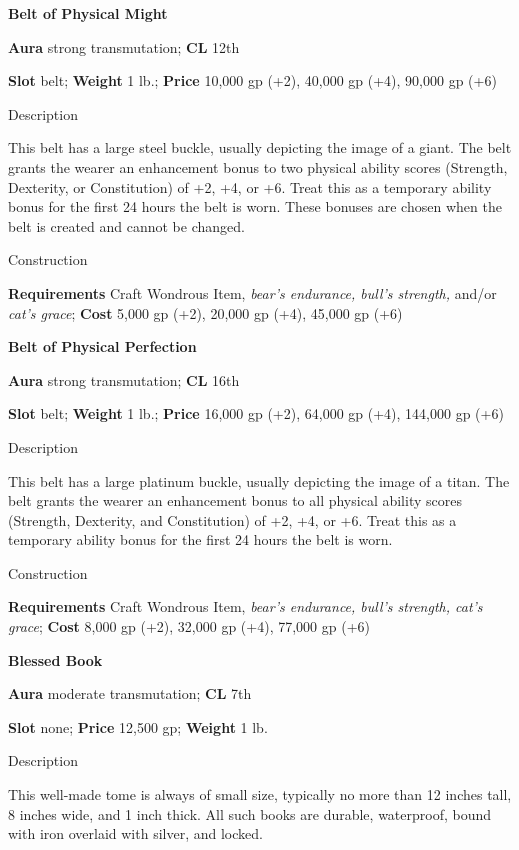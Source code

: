 \textbf{Belt of Physical Might}
				
\textbf{Aura} strong transmutation; \textbf{CL} 12th
				
\textbf{Slot }belt; \textbf{Weight} 1 lb.; \textbf{Price} 10,000 gp (+2), 40,000 gp (+4), 90,000 gp (+6)
				
Description
				
This belt has a large steel buckle, usually depicting the image of a giant. The belt grants the wearer an enhancement bonus to two physical ability scores (Strength, Dexterity, or Constitution) of +2, +4, or +6. Treat this as a temporary ability bonus for the first 24 hours the belt is worn. These bonuses are chosen when the belt is created and cannot be changed.
				
Construction
				
\textbf{Requirements }Craft Wondrous Item, \textit{bear's endurance, bull's strength, }and/or\textit{ cat's grace}; \textbf{Cost} 5,000 gp (+2), 20,000 gp (+4), 45,000 gp (+6)
				
\textbf{Belt of Physical Perfection}
				
\textbf{Aura} strong transmutation; \textbf{CL} 16th
				
\textbf{Slot }belt; \textbf{Weight} 1 lb.; \textbf{Price} 16,000 gp (+2), 64,000 gp (+4), 144,000 gp (+6)
				
Description
				
This belt has a large platinum buckle, usually depicting the image of a titan. The belt grants the wearer an enhancement bonus to all physical ability scores (Strength, Dexterity, and Constitution) of +2, +4, or +6. Treat this as a temporary ability bonus for the first 24 hours the belt is worn.
				
Construction
				
\textbf{Requirements }Craft Wondrous Item, \textit{bear's endurance, bull's strength, cat's grace}; \textbf{Cost} 8,000 gp (+2), 32,000 gp (+4), 77,000 gp (+6)
				
\textbf{Blessed Book}
				
\textbf{Aura} moderate transmutation;\textbf{ CL }7th
				
\textbf{Slot} none; \textbf{Price} 12,500 gp; \textbf{Weight} 1 lb.
				
Description
				
This well-made tome is always of small size, typically no more than 12 inches tall, 8 inches wide, and 1 inch thick. All such books are durable, waterproof, bound with iron overlaid with silver, and locked.
				
